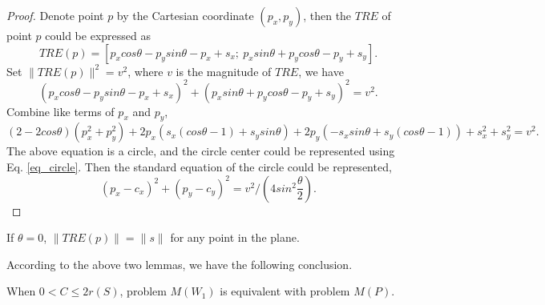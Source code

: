 \documentclass[final,3p,times]{elsarticle}
\begin{document}
\begin{proof}
Denote point $p$ by the Cartesian coordinate $(p_x,p_y)$, then the $TRE$ of point $p$ could be expressed as
\begin{equation*}
TRE(p) = [p_xcos\theta-p_ysin\theta-p_x+s_x;\ p_xsin\theta+p_ycos\theta-p_y+s_y].
\end{equation*}
Set $\|TRE(p)\|^2=v^2$, where $v$ is the magnitude of $TRE$, we have
\begin{equation*}
(p_xcos\theta-p_ysin\theta-p_x+s_x)^2 +(p_xsin\theta+p_ycos\theta-p_y+s_y)^2=v^2.
\end{equation*}
Combine like terms of $p_x$ and $p_y$,
\begin{equation*}
(2-2cos\theta)(p_x^2+p_y^2) + 2p_x(s_x(cos\theta-1)+s_ysin\theta) + 2p_y(-s_xsin\theta+s_y(cos\theta-1)) + s_x^2 + s_y^2 = v^2.
\end{equation*}
The above equation is a circle, and the circle center could be represented using Eq. \eqref{eq_circle}.
Then the standard equation of the circle could be represented,
\begin{equation*}
(p_x-c_x)^2 + (p_y-c_y)^2 = v^2/(4sin^2\frac{\theta}{2}).
\end{equation*}
\end{proof}
\begin{Lemma}
\label{lemma_contourline_2}
If $\theta=0$, $\|TRE(p)\|=\|s\|$ for any point in the plane.
\end{Lemma}
According to the above two lemmas, we have the following conclusion.
\begin{Theorem}
When $0<C\leq 2r(S)$, problem $M(W_1)$ is equivalent with problem $M(P)$.
\end{Theorem}
\end{document}
